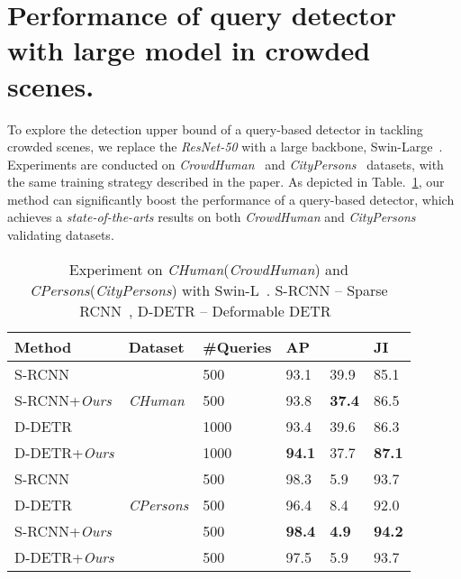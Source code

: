 \documentclass[final]{cvpr}
\begin{document}
\vspace{-0.1cm}
\section{Performance of query detector with large model in crowded scenes.}

To explore the detection upper bound of a query-based detector in tackling crowded scenes, we replace the \emph{ResNet-50} with a large backbone, Swin-Large~\cite{liu2021swin}. Experiments are conducted on \emph{CrowdHuman}~\cite{shao2018crowdhuman} and \emph{CityPersons}~\cite{zhang2017citypersons} datasets, with the same training strategy described in the paper. As depicted in Table.~\ref{tbl:large_model}, our method can significantly boost the performance of a query-based detector, which achieves a \textit{state-of-the-arts} results on both \emph{CrowdHuman} and \emph{CityPersons}  validating datasets.

\vspace{-0.2cm}
\begin{table}[ht]
	\centering
	\begin{tabular}{p{22mm}|p{12mm}<{\centering}|p{11mm}<{\centering}|p{4mm}<{\centering}p{5mm}<{\centering}p{4mm}<{\centering}}
		\toprule
		 Method& Dataset & \#Queries & AP &   & JI \\
		\hline
		 S-RCNN&  & 500 & 93.1 & 39.9 & 85.1 \\
		 S-RCNN+\emph{Ours} &\emph{CHuman} & 500 &  93.8 & \textbf{37.4} & 86.5 \\
		D-DETR & & 1000& 93.4 & 39.6 & 86.3 \\
		D-DETR+\emph{Ours} & & 1000& \textbf{94.1} & 37.7 & \textbf{87.1} \\
		\hline
		S-RCNN&  & 500 & 98.3 & 5.9 & 93.7 \\
		 D-DETR &\emph{CPersons} & 500 &  96.4 & 8.4 & 92.0 \\
		S-RCNN+\emph{Ours} & & 500& \textbf{98.4} & \textbf{4.9} & \textbf{94.2} \\
		D-DETR+\emph{Ours} & & 500& 97.5 & 5.9 & 93.7 \\
		
		\bottomrule
	\end{tabular}
	\caption{Experiment on \emph{CHuman}(\emph{CrowdHuman}) and \emph{CPersons}(\emph{CityPersons}) with Swin-L~\cite{liu2021swin}. S-RCNN -- Sparse RCNN~\cite{sun2020sparse}, D-DETR -- Deformable DETR~\cite{zhu2021deformable}}
	\label{tbl:large_model}
	\vspace{-2pc}
\end{table}
\clearpage
\end{document}
